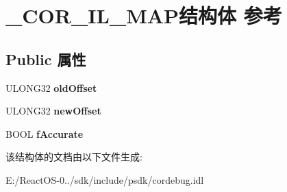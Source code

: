 \hypertarget{struct___c_o_r___i_l___m_a_p}{}\section{\+\_\+\+C\+O\+R\+\_\+\+I\+L\+\_\+\+M\+A\+P结构体 参考}
\label{struct___c_o_r___i_l___m_a_p}
\subsection*{Public 属性}
\begin{DoxyCompactItemize}
\item 
\mbox{\label{struct___c_o_r___i_l___m_a_p_a66a676f3853123d81139827510eeabf0}} 
U\+L\+O\+N\+G32 {\bfseries old\+Offset}
\item 
\mbox{\label{struct___c_o_r___i_l___m_a_p_a4cdf24bdec233708f07c1d4ff0ed02f1}} 
U\+L\+O\+N\+G32 {\bfseries new\+Offset}
\item 
\mbox{\label{struct___c_o_r___i_l___m_a_p_ad44554e2dd860af218dba4106e7a507d}} 
B\+O\+OL {\bfseries f\+Accurate}
\end{DoxyCompactItemize}


该结构体的文档由以下文件生成\+:\begin{DoxyCompactItemize}
\item 
E\+:/\+React\+O\+S-\/0../sdk/include/psdk/cordebug.\+idl\end{DoxyCompactItemize}
